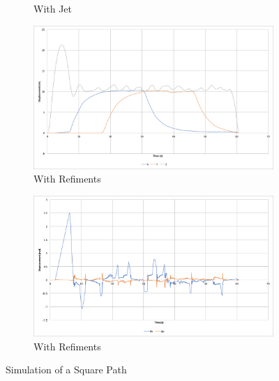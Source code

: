 \documentclass[11pt]{article}
\begin{document}
\begin{figure}[p]
\begin{subfigure}{0.48\textwidth}
        \caption{With Jet}
        \label{fig:square_path_w_jet_angle}
    \end{subfigure}\hspace*{\fill}
    \begin{subfigure}{0.48\textwidth}
        \includegraphics[width=\linewidth]{square_path_limited_servos}
        \caption{With Refiments}
        \label{fig:square_path_limited_servos}
    \end{subfigure}
    \medskip
    \begin{subfigure}{0.48\textwidth}
        \includegraphics[width=\linewidth]{square_path_limited_servos_angle}
        \caption{With Refiments}
        \label{fig:square_path_limited_servos_angle}
    \end{subfigure}\hspace*{\fill}
    \begin{subfigure}{0.48\textwidth}
    \end{subfigure}

    \caption{Simulation of a Square Path}
    \label{fig:Square Path}
\end{figure}
\end{document}
